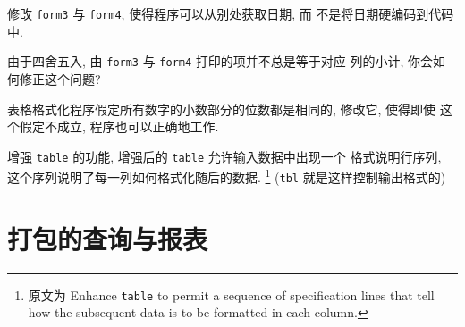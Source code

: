 \begin{exercise}
	修改 \verb'form3' 与 \verb'form4', 使得程序可以从别处获取日期, 而
	不是将日期硬编码到代码中.
\end{exercise}

\begin{exercise}
    由于四舍五入, 由 \verb'form3' 与 \verb'form4' 打印的项并不总是等于对应
    列的小计, 你会如何修正这个问题?
\end{exercise}

\begin{exercise}
    表格格式化程序假定所有数字的小数部分的位数都是相同的, 修改它, 使得即使 
    这个假定不成立, 程序也可以正确地工作.
\end{exercise}

\begin{exercise}
    增强 \verb'table' 的功能, 增强后的 \verb'table' 允许输入数据中出现一个
    格式说明行序列, 这个序列说明了每一列如何格式化随后的数据.
    \footnote{原文为 
        Enhance \texttt{table} to permit a sequence of specification lines
        that tell how the subsequent data is to be formatted in each column.
    } (\texttt{tbl} 就是这样控制输出格式的)
\end{exercise}

\section{打包的查询与报表}
\label{sec:packaged_queries_and_reports}

